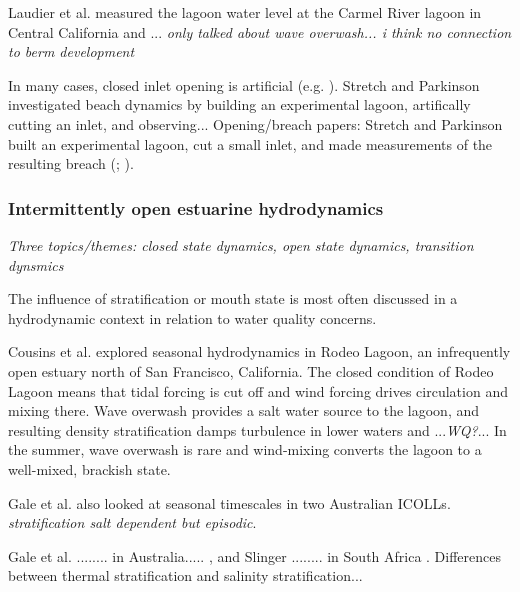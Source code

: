Laudier et al. \parencite*{laudier_measured_2011} measured the lagoon water level at the Carmel River lagoon in Central California and ... \emph{only talked about wave overwash... i think no connection to berm development}


In many cases, closed inlet opening is artificial (e.g. \cite{fortunato_morphological_2014, behrens_episodic_2013}). Stretch and Parkinson investigated beach dynamics by building an experimental lagoon, artifically cutting an inlet, and observing...
Opening/breach papers: \parencite{rich_hydrologic_2013, parkinson_breaching_2007, stretch_breaching_2006, elwany_opening_1998, fortunato_morphological_2014}
Stretch and Parkinson built an experimental lagoon, cut a small inlet, and made measurements of the resulting breach (\cite*{stretch_breaching_2006}; \cite{parkinson_breaching_2007}).



\subsubsection{Intermittently open estuarine hydrodynamics}
\emph{Three topics/themes: closed state dynamics, open state dynamics, transition dynsmics}


The influence of stratification or mouth state is most often discussed in a hydrodynamic context in relation to water quality concerns.

Cousins et al. \parencite*{cousins_effects_2010} explored seasonal hydrodynamics in Rodeo Lagoon, an infrequently open estuary north of San Francisco, California. The closed condition of Rodeo Lagoon means that tidal forcing is cut off and wind forcing drives circulation and mixing there. Wave overwash provides a salt water source to the lagoon, and resulting density stratification damps turbulence in lower waters and ...\emph{WQ?}... In the summer, wave overwash is rare and wind-mixing converts the lagoon to a well-mixed, brackish state.

Gale et al. \parencite*{gale_vertical_2006} also looked at seasonal timescales in two Australian ICOLLs. \emph{stratification salt dependent but episodic}. 




 Gale et al. ........ in Australia..... \parencite*{gale_vertical_2006}, and Slinger ........ in South Africa \parencite*{slinger_evolution_1990}. Differences between thermal stratification and salinity stratification... 

